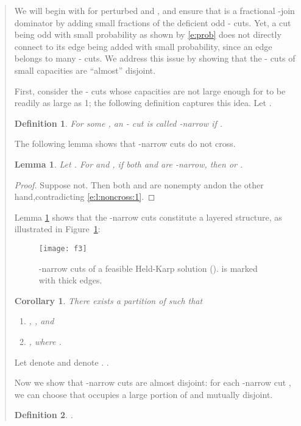 \documentclass[11pt,letterpaper]{article}
\newtheorem{lemma}{Lemma}
\newtheorem{cor}{Corollary}
\newtheorem{defn}{Definition}
\newcommand{\st}{\mbox{-} }
\begin{document}
\begin{quote}
We will begin with  for perturbed  and , and ensure that  is a fractional -join dominator by adding small fractions of the deficient odd \st cuts. Yet, a cut being odd with small probability as shown by \eqref{e:prob} does not directly connect to its edge being added with small probability, since an edge belongs to many \st cuts. We address this issue by showing that the \st cuts of small capacities are ``almost'' disjoint.

First, consider the \st cuts  whose capacities are not large enough for  to be readily as large as 1; the following definition captures this idea. Let .

\begin{defn}
For some , an \st cut  is called \emph{-narrow} if .
\end{defn}

The following lemma shows that -narrow cuts do not cross.

\begin{lemma}\label{l:noncross}
Let . For  and , if both  and  are -narrow, then  or .
\end{lemma}
\begin{proof}
Suppose not. Then both  and  are nonempty andon the other hand,contradicting \eqref{e:l:noncross:1}.
\end{proof}

Lemma \ref{l:noncross} shows that the -narrow cuts constitute a layered structure, as illustrated in Figure~\ref{f:layer}:
\begin{figure}
\center
\texttt{[image: f3]}
\caption{-narrow cuts of a feasible Held-Karp solution ().  is marked with thick edges.}
\label{f:layer}
\end{figure}

\begin{cor}\label{c:layer}
There exists a partition  of  such that\begin{enumerate}
\item , , and
\item , where .
\end{enumerate}
\end{cor}

Let  denote  and  denote . .

Now we show that -narrow cuts are almost disjoint: for each -narrow cut , we can choose  that occupies a large portion of  and mutually disjoint.

\begin{defn}
.
\end{defn}


\end{quote}
\end{document}
